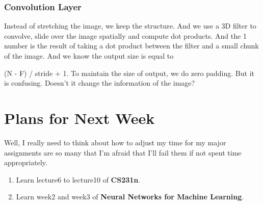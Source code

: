 \documentclass{article}
\begin{document}
\subsubsection{Convolution Layer}
Instead of stretching the image, we keep the structure. And we use a 3D filter to convolve, slide over the image spatially and compute dot products.
And the 1 number is the result of taking a dot product between the filter and a small chunk of the image. And we know the output size is equal to

(N - F) / stride + 1. To maintain the size of output, we do zero padding. But it is confusing. Doesn't it change the information of the image?

\section{Plans for Next Week}
Well, I really need to think about how to adjust my time for my major assignments are so many that I'm afraid that I'll fail them if not spent time appropriately.
\begin{enumerate}
  \item Learn lecture6 to lecture10 of  \textbf{CS231n}.
  \item Learn week2 and week3 of \textbf{Neural Networks for Machine Learning}.
\end{enumerate}
\end{document}
